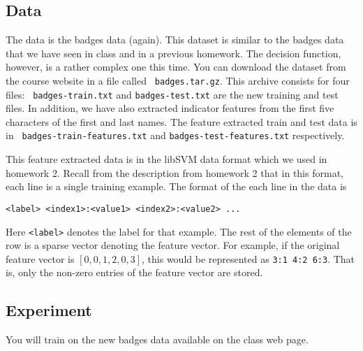 \subsection*{Data}

The data is the badges data (again). This dataset is similar to the
badges data that we have seen in class and in a previous homework. The
decision function, however, is a rather complex one this time. You can
download the dataset from the course website in a file called {\tt
  badges.tar.gz}. This archive consists for four files: {\tt
  badges-train.txt} and {\tt badges-test.txt} are the new training and
test files. In addition, we have also extracted indicator features
from the first five characters of the first and last names. The
feature extracted train and test data is in {\tt
  badges-train-features.txt} and {\tt badges-test-features.txt}
respectively. 

This feature extracted data is in the libSVM data format which we used
in homework 2. Recall from the description from homework 2 that in
this format, each line is a single training example. The format of the
each line in the data is

{\tt <label> <index1>:<value1> <index2>:<value2> ...}

Here {\tt <label>} denotes the label for that example. The rest of the
elements of the row is a sparse vector denoting the feature vector.
For example, if the original feature vector is $[0, 0, 1, 2, 0, 3]$,
this would be represented as {\tt 3:1 4:2 6:3}. That is, only the
non-zero entries of the feature vector are stored.

\subsection*{Experiment}

You will train on the new badges data available on the class web page.

